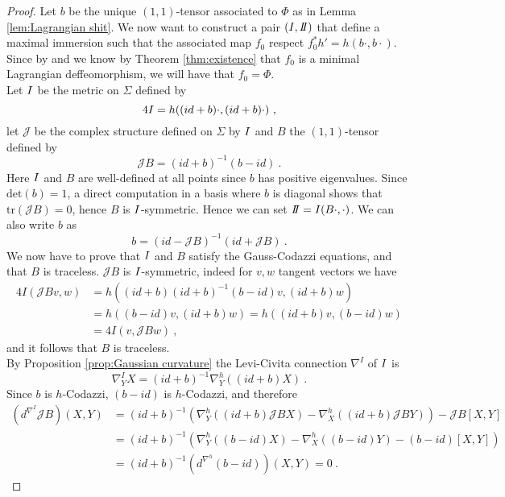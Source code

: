 \begin{proof}
    Let $b$ be the unique $(1,1)$-tensor associated to $\Phi$ as in Lemma \ref{lem:Lagrangian shit}. We now want to construct a pair $(\I,\II)$ that define a maximal immersion such that the associated map $f_0$ respect $f_0^* h' = h(b \cdot, b \cdot)$. Since by  and we know by Theorem \ref{thm:existence} that $f_0$ is a minimal Lagrangian deffeomorphism, we will have that $f_0 = \Phi$.\\
    Let $I$ be the metric on $\Sigma$ defined by
    \[
        4 I = h((id + b)\cdot , (id + b)\cdot ) \ ,
    \]
    let $\mathcal{J}$ be the complex structure defined on $\Sigma$ by $I$ and $B$ the $(1,1)$-tensor defined by
    \[
        \mathcal{J} B = (id + b)^{-1} (b-id) \ .
    \]
    Here $I$ and $B$ are well-defined at all points since $b$ has positive eigenvalues. Since $\text{det}(b)=1$, a direct computation in a basis where $b$ is diagonal shows that $\text{tr}(\mathcal{J} B) = 0 $, hence $B$ is $I$-symmetric. Hence we can set $\II = \I (B \cdot, \cdot)$. We can also write $b$ as
    \[
        b = (id - \mathcal{J}B)^{-1} (id+\mathcal{J}B) \ .
    \]  
    We now have to prove that $I$ and $B$ satisfy the Gauss-Codazzi equations, and that $B$ is traceless.
    $\mathcal{J} B$ is $I$-symmetric, indeed for $v,w$ tangent vectors we have
    \[
    \begin{split}
        4I(\mathcal{J}B v,w) & = h((id + b) (id + b)^{-1} (b-id) v , (id + b)w) \\
        & = h((b-id) v , (id + b)w) = h((id + b) v , (b-id)w) \\
        & = 4 I (v, \mathcal{J}B w) \ ,
    \end{split}
    \]
    and it follows that $B$ is traceless.\\
    By Proposition \ref{prop:Gaussian curvature} the Levi-Civita connection $\nabla^I$ of $I$ is
    \[
        \nabla^I_Y X = (id + b)^{-1} \nabla^h_Y ((id+b)X) \ .
    \]
    Since $b$ is $h$-Codazzi, $(b-id)$ is $h$-Codazzi, and therefore
    \[
    \begin{split}
        (d^{\nabla^I} \mathcal{J}B)(X,Y) & = (id + b)^{-1} (\nabla^h_Y ((id+b)\mathcal{J}B X) - \nabla^h_X ((id+b)\mathcal{J}B Y) ) - \mathcal{J}B \left[ X,Y \right] \\
        & = (id + b)^{-1} (\nabla^h_Y ((b-id) X) -  \nabla^h_X ((b-id) Y) - (b-id) \left[ X,Y \right] ) \\
        & = (id + b)^{-1}(d^{\nabla^h}(b-id))(X,Y) = 0 \ .
    \end{split}
\]
\end{proof}
